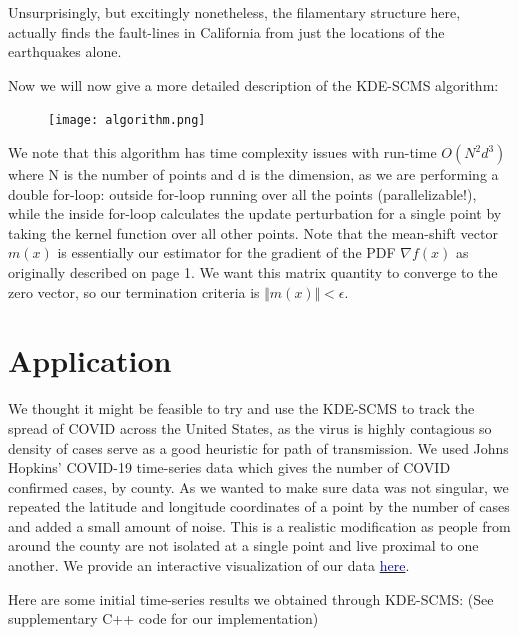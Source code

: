 \documentclass[letterpaper,reqno, 11pt]{amsart}
\theoremstyle{plain}
\theoremstyle{definition}
\newcommand{\1}{\mathds{1}}
\begin{document}
Unsurprisingly, but excitingly nonetheless, the filamentary structure here, actually finds the fault-lines in California from just the locations of the earthquakes alone.

\begin{figure}[hbt]
    \centering
    \qquad
    \label{fig:faultlines}%
\end{figure}

\newpage
Now we will now give a more detailed description of the KDE-SCMS algorithm\cite{algo}:
\begin{figure}[hbt]
\texttt{[image: algorithm.png]}
\end{figure}

We note that this algorithm has time complexity issues with run-time $O(N^2 d^3)$ where N is the number of points and d is the dimension, as we are performing a double for-loop: outside for-loop running over all the points (parallelizable!), while the inside for-loop calculates the update perturbation for a single point by taking the kernel function over all other points. Note that the mean-shift vector $m(x)$ is essentially our estimator for the gradient of the PDF $\nabla f(x)$ as originally described on page 1. We want this matrix quantity to converge to the zero vector, so our termination criteria is $\Vert m(x) \Vert < \epsilon$.

\section{Application}

We thought it might be feasible to try and use the KDE-SCMS to track the spread of COVID across the United States, as the virus is highly contagious so density of cases serve as a good heuristic for path of transmission. We used Johns Hopkins' COVID-19 time-series data\cite{covid_data} which gives the number of COVID confirmed cases, by county. As we wanted to make sure data was not singular, we repeated the latitude and longitude coordinates of a point by the number of cases and added a small amount of noise. This is a realistic modification as people from around the county are not isolated at a single point and live proximal to one another. We provide an interactive visualization of our data \href{https://kepler.gl/demo/map?mapUrl=https://dl.dropboxusercontent.com/s/tmpj2dkr0w1vhoj/keplergl_7k43a5f.json}{\textcolor{darkblue}{here}}.


\newpage
\Large Here are some initial time-series results we obtained through KDE-SCMS:
\mbox{}
\normalsize (See supplementary C++ code for our implementation)
\end{document}
